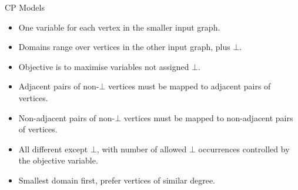 \documentclass{beamer}
\begin{document}
\begin{frame}{CP Models}
    \begin{itemize}
        \item One variable for each vertex in the smaller input graph.
        \item Domains range over vertices in the other input graph, plus $\bot$.
        \item Objective is to maximise variables not assigned $\bot$.
        \item Adjacent pairs of non-$\bot$ vertices must be mapped to adjacent pairs of vertices.
        \item Non-adjacent pairs of non-$\bot$ vertices must be mapped to non-adjacent pairs of vertices.
        \item All different except $\bot$, with number of allowed $\bot$ occurrences controlled by
            the objective variable.
        \item Smallest domain first, prefer vertices of similar degree.
    \end{itemize}
\end{frame}
\end{document}
